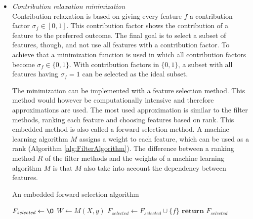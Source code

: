 	
	\begin{itemize}
		\item \textit{Contribution relaxation minimization} \\
		
		Contribution relaxation is based on giving every feature $f$ a contribution factor $\sigma_f \in [0, 1]$. This contribution factor shows the contribution of a feature to the preferred outcome. The final goal is to select a subset of features, though, and not use all features with a contribution factor. To achieve that a minimization function is used in which all contribution factors become $\sigma_f \in \{0, 1\}$. With contribution factors in $\{0, 1\}$, a subset with all features having $\sigma_f = 1$ can be selected as the ideal subset\cite{Lal2006}. 
		
		The minimization can be implemented with a feature selection method. This method would however be computationally intensive and therefore approximations are used. The most used approximation is similar to the filter methods, ranking each feature and choosing features based on rank. This embedded method is also called a forward selection method. A machine learning algorithm $M$ assigns a weight to each feature, which can be used as a rank (Algorithm \ref{alg:FilterAlgorithm}). The difference between a ranking method $R$ of the filter methods and the weights of a machine learning algorithm $M$ is that $M$ also take into account the dependency between features\cite{Lal2006}.
		
		\begin{algorithm}[H]
			\caption{An embedded forward selection algorithm\cite{Lal2006}}\label{alg:EmbeddedForwardSelectionAlgorithm}
			\begin{algorithmic}[1]
				\State $F_{\textit{selected}} \gets \O$ 	
				\State $W \gets M(X, y)$					
				 					
							
				\State $F_{\textit{selected}} \gets F_{\textit{selected}} \cup \{f\}$ 
				\EndIf
				\EndFor
				\State $\textbf{return } F_{\textit{selected}}$
				\EndProcedure
			\end{algorithmic}
		\end{algorithm}
		

\end{itemize}
